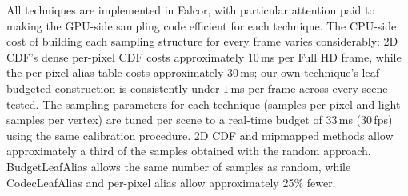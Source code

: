 \documentclass[acmtog,review]{acmart}
\begin{document}
All techniques are implemented in Falcor, with particular
attention paid to making the GPU-side sampling code efficient for each technique. The CPU-side cost
of building each sampling structure for every frame varies considerably: 2D CDF's
dense per-pixel CDF costs approximately $10$\,ms per Full HD frame, while the per-pixel alias table costs approximately $30$\,ms; our own technique's
leaf-budgeted construction is consistently under $1$\,ms per frame across every scene tested. The sampling parameters for each technique (samples per pixel and light samples per vertex) are tuned per scene to a real-time budget of $33$\,ms (30\,fps) using the same calibration procedure. 
2D CDF and mipmapped methods allow approximately a third of the samples obtained with the random approach. BudgetLeafAlias allows the same number of samples as random, while CodecLeafAlias and per-pixel alias allow approximately 25\% fewer. 

\begin{table}[htbp!]
\centering\small\newmat
\setlength{\tabcolsep}{3pt}
\caption{\newmat Calibrated real-time configuration of each technique per scene: samples per pixel $\times$ light samples per shading point, each within the 33\,ms frame. }
\label{tab:configs}
\end{table}
\end{document}
